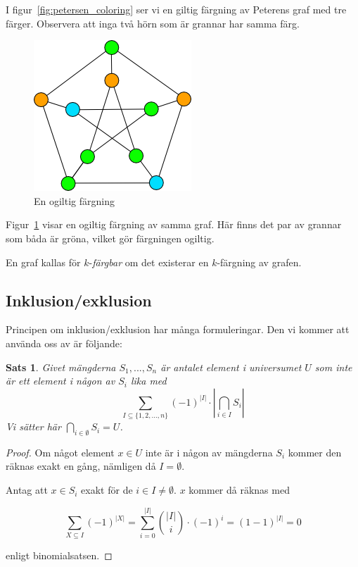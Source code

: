 \documentclass[a4paper]{report}
\newtheorem{theorem}{Sats}
\begin{document}
I figur~\ref{fig:petersen_coloring} ser vi en giltig färgning av Peterens graf med tre färger. Observera att inga två hörn som är grannar har samma färg.

\begin{figure}[h!]
\centering
\includegraphics{ogiltig_petersen}
\caption{En ogiltig färgning}
\label{fig:invalid_coloring}
\end{figure}

Figur~\ref{fig:invalid_coloring} visar en ogiltig färgning av samma graf. Här finns det par av grannar som båda är gröna, vilket gör färgningen ogiltig.

En graf kallas för $k$-\emph{färgbar} om det existerar en $k$-färgning av grafen.

\subsection{Inklusion/exklusion}

Principen om inklusion/exklusion har många formuleringar. Den vi kommer att använda oss av är följande:

\begin{theorem}
    Givet mängderna $S_1, ..., S_n$ är antalet element i universumet $U$ som inte är ett element i någon av $S_i$ lika med
    $$\sum_{I \subseteq \{1, 2, ..., n\}}{(-1)^{|I|} \cdot |\bigcap_{i\in I}{S_i}|}$$
    Vi sätter här $\bigcap_{i \in \emptyset}{S_i} = U$.
\end{theorem}
\begin{proof}
    Om något element $x \in U$ inte är i någon av mängderna $S_i$ kommer den räknas exakt en gång, nämligen då $I = \emptyset$.

    Antag att $x \in S_i$ exakt för de $i \in I \not= \emptyset$. $x$ kommer då räknas med

    $$\sum_{X \subseteq I}{(-1)^{|X|}} = \sum_{i=0}^{|I|}{{|I| \choose i}\cdot(-1)^i} = (1-1)^{|I|} = 0$$

    enligt binomialsatsen.
\end{proof}
\end{document}
